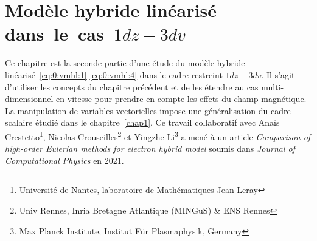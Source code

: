 \renewcommand{\localPath}{chap3}

\chapter{Modèle hybride linéarisé dans~le~cas~$1dz-3dv$}
\label{chap3}

Ce chapitre est la seconde partie d'une étude du modèle hybride linéarisé~\eqref{eq:0:vmhl:1}-\eqref{eq:0:vmhl:4} dans le cadre restreint $1dz-3dv$. Il s'agit d'utiliser les concepts du chapitre précédent et de les étendre au cas multi-dimensionnel en vitesse pour prendre en compte les effets du champ magnétique. La manipulation de variables vectorielles impose une généralisation du cadre scalaire étudié dans le chapitre~\ref{chap1}. Ce travail collaboratif avec Anaïs Crestetto\footnote{Université de Nantes, laboratoire de Mathématiques Jean Leray}, Nicolas Crouseilles\footnote{Univ Rennes, Inria Bretagne Atlantique (MINGuS) \& ENS Rennes} et Yingzhe Li\footnote{Max Planck Institute, Institut Für Plasmaphysik, Germany} a mené à un article \emph{Comparison of high-order Eulerian methods for electron hybrid model} soumis dans \emph{Journal of Computational Physics} en 2021.









